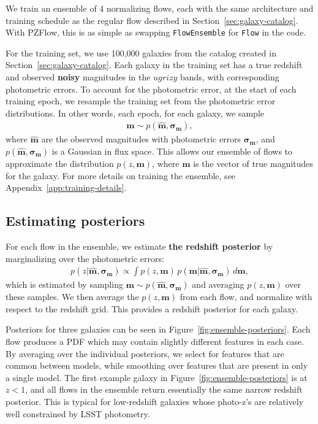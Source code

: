\documentclass[twocolumn,twocolappendix]{aastex631}
\begin{document}
We train an ensemble of 4 normalizing flows, each with the same architecture and training schedule as the regular flow described in Section~\ref{sec:galaxy-catalog}.
With PZFlow, this is as simple as swapping \texttt{FlowEnsemble} for \texttt{Flow} in the code.

For the training set, we use 100,000 galaxies from the catalog created in Section~\ref{sec:galaxy-catalog}.
Each galaxy in the training set has a true redshift and observed \textbf{noisy} magnitudes in the $ugrizy$ bands, with corresponding photometric errors.
To account for the photometric error, at the start of each training epoch, we resample the training set from the photometric error distributions.
In other words, each epoch, for each galaxy, we sample
\begin{align}
    \mathbf{m} \sim p(\mathbf{\hat{m}}, \mathbf{\sigma_m}),
\end{align}
where $\mathbf{\hat{m}}$ are the observed magnitudes with photometric errors $\mathbf{\sigma_m}$, and $p(\mathbf{\hat{m}}, \mathbf{\sigma_m})$ is a Gaussian in flux space.
This allows our ensemble of flows to approximate the distribution $p(z, \mathbf{m})$, where $\mathbf{m}$ is the vector of true magnitudes for the galaxy.
For more details on training the ensemble, see Appendix~\ref{app:training-details}.


\subsection{Estimating posteriors}

For each flow in the ensemble, we estimate \textbf{the redshift posterior} by marginalizing over the photometric errors:
\begin{align}
    p(z| \mathbf{\hat{m}}, \mathbf{\sigma_m}) \propto \int p(z, \mathbf{m}) \, p(\mathbf{m}| \mathbf{\hat{m}}, \mathbf{\sigma_m}) \, d\mathbf{m},
\end{align}
which is estimated by sampling $\mathbf{m} \sim p(\mathbf{\hat{m}}, \mathbf{\sigma_m})$ and averaging $p(z, \mathbf{m})$ over these samples.
We then average the $p(z, \mathbf{m})$ from each flow, and normalize with respect to the redshift grid.
This provides a redshift posterior for each galaxy.

Posteriors for three galaxies can be seen in Figure~\ref{fig:ensemble-posteriors}.
Each flow produces a PDF which may contain slightly different features in each case.
By averaging over the individual posteriors, we select for features that are common between models, while smoothing over features that are present in only a single model.
The first example galaxy in Figure~\ref{fig:ensemble-posteriors} is at $z < 1$, and all flows in the ensemble return essentially the same narrow redshift posterior.
This is typical for low-redshift galaxies whose photo-z's are relatively well constrained by LSST photometry.
\end{document}
